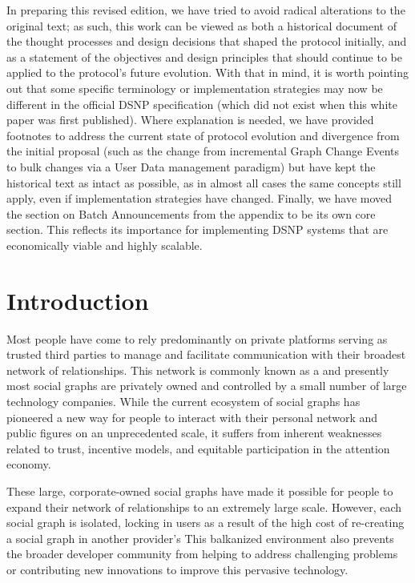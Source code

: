 \documentclass[12pt,letterpaper]{article}
\begin{document}
In preparing this revised edition, we have tried to avoid radical alterations to the original
text; as such, this work can be viewed as both a historical document of the thought
processes and design decisions that shaped the protocol initially, and as a statement of the
objectives and design principles that should continue to be applied to the protocol's future
evolution. With that in mind, it is worth pointing out that some specific terminology or
implementation strategies may now be different in the official DSNP specification (which did
not exist when this white paper was first published). Where explanation is needed, we have
provided footnotes to address the current state of protocol evolution and divergence from
the initial proposal (such as the change from incremental Graph Change Events to bulk
changes via a User Data management paradigm) but have kept the historical text as intact as
possible, as in almost all cases the same concepts still apply, even if implementation
strategies have changed. Finally, we have moved the section on Batch Announcements from the
appendix to be its own core section. This reflects its importance for implementing DSNP
systems that are economically viable and highly scalable.

\clearpage
\section{Introduction}\label{sec:introduction}

Most people have come to rely predominantly on private platforms serving as trusted third
parties to manage and facilitate communication with their broadest network of
relationships. This network is commonly known as a  and presently most
social graphs are privately owned and controlled by a small number of large technology
companies. While the current ecosystem of social graphs has pioneered a new way for people
to interact with their personal network and public figures on an unprecedented scale, it
suffers from inherent weaknesses related to trust, incentive models, and equitable
participation in the attention economy.

These large, corporate-owned social graphs have made it possible for people to expand
their network of relationships to an extremely large scale. However, each social graph is
isolated, locking in users as a result of the high cost of re-creating a social graph in
another provider's  This balkanized environment also prevents the
broader developer community from helping to address challenging problems or contributing
new innovations to improve this pervasive technology.
\end{document}
